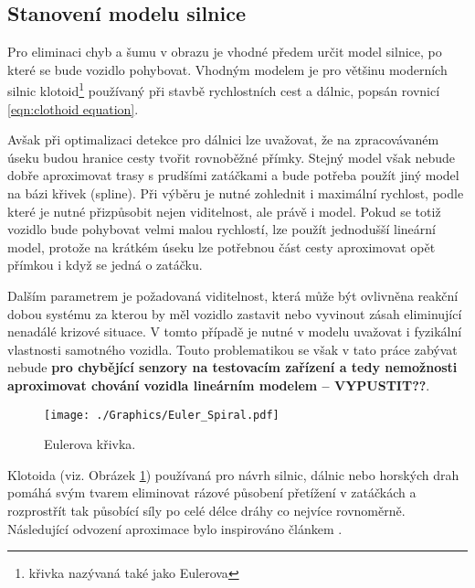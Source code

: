 \documentclass[czech, bc, kky, he, iso690numb]{fasthesis}
\begin{document}
            \subsection{Stanovení modelu silnice}\label{chap:01_stanoveni_modelu_silnice}
                Pro eliminaci chyb a šumu v obrazu je vhodné předem určit model silnice, po které se bude vozidlo pohybovat. Vhodným modelem je pro většinu moderních silnic klotoid\footnote{křivka nazývaná také jako Eulerova} používaný při stavbě rychlostních cest a dálnic, popsán rovnicí \ref{eqn:clothoid equation}.
                
                Avšak při optimalizaci detekce pro dálnici lze uvažovat, že na zpracovávaném úseku budou hranice cesty tvořit rovnoběžné přímky. Stejný model však nebude dobře aproximovat trasy s prudšími zatáčkami a bude potřeba použít jiný model na bázi křivek (spline). Při výběru je nutné zohlednit i maximální rychlost, podle které je nutné přizpůsobit nejen viditelnost, ale právě i model. Pokud se totiž vozidlo bude pohybovat velmi malou rychlostí, lze použít jednodušší lineární model, protože na krátkém úseku lze potřebnou část cesty aproximovat opět přímkou i když se jedná o zatáčku.
                
                Dalším parametrem je požadovaná viditelnost, která může být ovlivněna reakční dobou systému za kterou by měl vozidlo zastavit nebo vyvinout zásah eliminující nenadálé krizové situace. V tomto případě je nutné v modelu uvažovat i fyzikální vlastnosti samotného vozidla. Touto problematikou se však v tato práce zabývat nebude \textbf{pro chybějící senzory na testovacím zařízení a tedy nemožnosti aproximovat chování vozidla lineárním modelem -- VYPUSTIT??}.
                
                	\begin{figure}[h]
                		\centering
                		\texttt{[image: ./Graphics/Euler\_Spiral.pdf]}
                		\caption{Eulerova křivka.}
                		\label{pic:Eulerova_krivka}
                	\end{figure}
                
                Klotoida (viz. Obrázek \ref{pic:Eulerova_krivka}) používaná pro návrh silnic, dálnic nebo horských drah pomáhá svým tvarem eliminovat rázové působení přetížení v zatáčkách a rozprostřít tak působící síly po celé délce dráhy co nejvíce rovnoměrně. Následující odvození aproximace bylo inspirováno článkem \cite{eliou_kaliabetsos_2013}.
                
\end{document}

